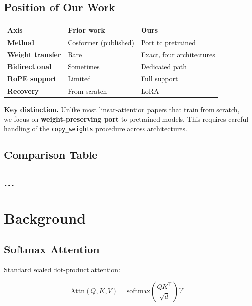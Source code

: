 \subsection{Position of Our Work}

\begin{table}[H]
\centering
\small
\begin{tabular}{lll}
\toprule
\textbf{Axis} & \textbf{Prior work} & \textbf{Ours} \\
\midrule
\textbf{Method} & Cosformer (published) & Port to pretrained \\
\textbf{Weight transfer} & Rare & Exact, four architectures \\
\textbf{Bidirectional} & Sometimes & Dedicated path \\
\textbf{RoPE support} & Limited & Full support \\
\textbf{Recovery} & From scratch & LoRA \\
\bottomrule
\end{tabular}
\end{table}

\textbf{Key distinction.} Unlike most linear-attention papers that train from 
scratch, we focus on \textbf{weight-preserving port} to pretrained models. This 
requires careful handling of the \texttt{copy\_weights} procedure across 
architectures.



\subsection{Comparison Table}

\begin{lstlisting}

---
\end{lstlisting}


\section{Background}

\subsection{Softmax Attention}

Standard scaled dot-product attention:

\[
\text{Attn}(Q, K, V) = \text{softmax}\!\left(\frac{QK^\top}{\sqrt{d}}\right)V
\]

